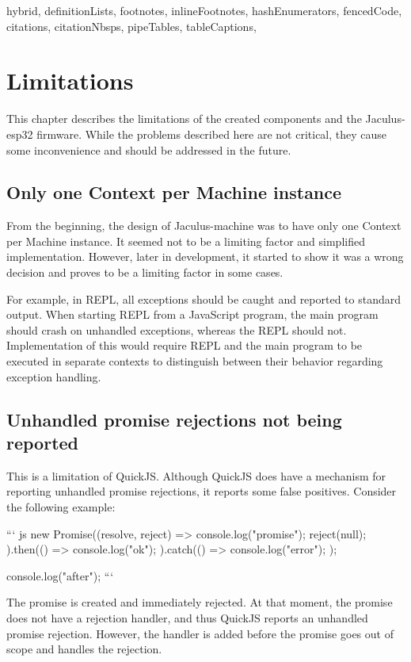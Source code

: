 \begin{markdown*}{%
  hybrid,
  definitionLists,
  footnotes,
  inlineFootnotes,
  hashEnumerators,
  fencedCode,
  citations,
  citationNbsps,
  pipeTables,
  tableCaptions,
}

\chapter{Limitations}

This chapter describes the limitations of the created components and the Jaculus-esp32 firmware. While the problems described here are not critical, they cause some inconvenience and should be addressed in the future.

\section{Only one Context per Machine instance}

From the beginning, the design of Jaculus-machine was to have only one Context per Machine instance. It seemed not to be a limiting factor and simplified implementation. However, later in development, it started to show it was a wrong decision and proves to be a limiting factor in some cases.

For example, in REPL, all exceptions should be caught and reported to standard output. When starting REPL from a JavaScript program, the main program should crash on unhandled exceptions, whereas the REPL should not. Implementation of this would require REPL and the main program to be executed in separate contexts to distinguish between their behavior regarding exception handling.


\section{Unhandled promise rejections not being reported}

This is a limitation of QuickJS. Although QuickJS does have a mechanism for reporting unhandled promise rejections, it reports some false positives. Consider the following example:

``` js
new Promise((resolve, reject) => {
    console.log("promise");
    reject(null);
}).then(() => {
    console.log("ok");
}).catch(() => {
    console.log("error");
});

console.log("after");
```

The promise is created and immediately rejected. At that moment, the promise does not have a rejection handler, and thus QuickJS reports an unhandled promise rejection. However, the handler is added before the promise goes out of scope and handles the rejection.


\end{markdown*}
